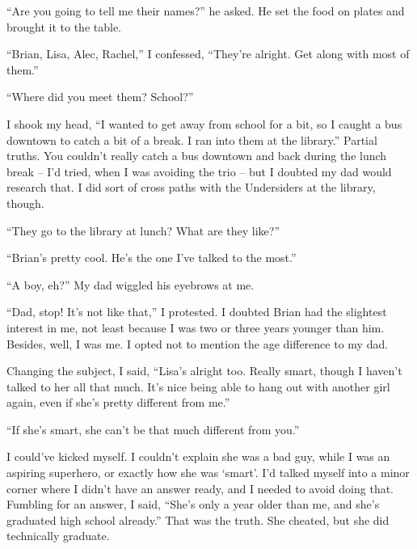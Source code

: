 ``Are you going to tell me their names?'' he asked.  He set the food on plates and brought it to the table.



``Brian, Lisa, Alec, Rachel,'' I confessed, ``They're alright.  Get along with most of them.''



``Where did you meet them?  School?''



I shook my head, ``I wanted to get away from school for a bit, so I caught a bus downtown to catch a bit of a break.  I ran into them at the library.''  Partial truths.  You couldn't really catch a bus downtown and back during the lunch break – I'd tried, when I was avoiding the trio – but I doubted my dad would research that.  I did sort of cross paths with the Undersiders at the library, though.



``They go to the library at lunch?  What are they like?''



``Brian's pretty cool.  He's the one I've talked to the most.''



``A boy, eh?'' My dad wiggled his eyebrows at me.



``Dad, stop!  It's not like that,'' I protested.  I doubted Brian had the slightest interest in me, not least because I was two or three years younger than him.  Besides, well, I was me.  I opted not to mention the age difference to my dad.



Changing the subject, I said, ``Lisa's alright too.  Really smart, though I haven't talked to her all that much.  It's nice being able to hang out with another girl again, even if she's pretty different from me.''



``If she's smart, she can't be that much different from you.''



I could've kicked myself.  I couldn't explain she was a bad guy, while I was an aspiring superhero, or exactly how she was `smart'.  I'd talked myself into a minor corner where I didn't have an answer ready, and I needed to avoid doing that.  Fumbling for an answer, I said, ``She's only a year older than me, and she's graduated high school already.''  That was the truth. She cheated, but she did technically graduate.



